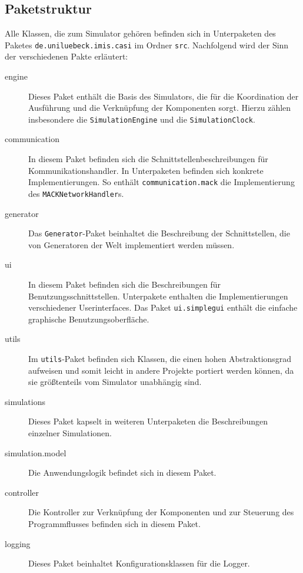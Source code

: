 \subsection{Paketstruktur}
Alle Klassen, die zum Simulator gehören befinden sich in Unterpaketen des Paketes \texttt{de.uniluebeck\-.imis.casi} im Ordner \texttt{src}.
Nachfolgend wird der Sinn der verschiedenen Pakte erläutert:
\begin{description}
	\item[engine] Dieses Paket enthält die Basis des Simulators, die für die Koordination der Ausführung und die Verknüpfung der Komponenten sorgt. Hierzu zählen insbesondere die \texttt{SimulationEngine} und die \texttt{SimulationClock}.
	\item[communication] In diesem Paket befinden sich die Schnittstellenbeschreibungen für Kommunikationshandler. In Unterpaketen befinden sich konkrete Implementierungen. So enthält \texttt{com\-munication\-.mack} die Implementierung des \texttt{MACKNetworkHandler}s.
	\item[generator] Das \texttt{Generator}-Paket beinhaltet die Beschreibung der Schnittstellen, die von Generatoren der Welt implementiert werden müssen.
	\item[ui] In diesem Paket befinden sich die Beschreibungen für Benutzungsschnittstellen. Unterpakete enthalten die Implementierungen verschiedener Userinterfaces. Das Paket \texttt{ui.simplegui} enthält die einfache graphische Benutzungsoberfläche.
	\item[utils] Im \texttt{utils}-Paket befinden sich Klassen, die einen hohen Abstraktionsgrad aufweisen und somit leicht in andere Projekte portiert werden können, da sie größtenteils vom Simulator unabhängig sind.
	\item[simulations] Dieses Paket kapselt in weiteren Unterpaketen die Beschreibungen einzelner Simulationen.
	\item[simulation.model] Die Anwendungslogik befindet sich in diesem Paket.
	\item[controller] Die Kontroller zur Verknüpfung der Komponenten und zur Steuerung des Programmflusses befinden sich in diesem Paket.
	\item[logging] Dieses Paket beinhaltet Konfigurationsklassen für die Logger.
\end{description}
